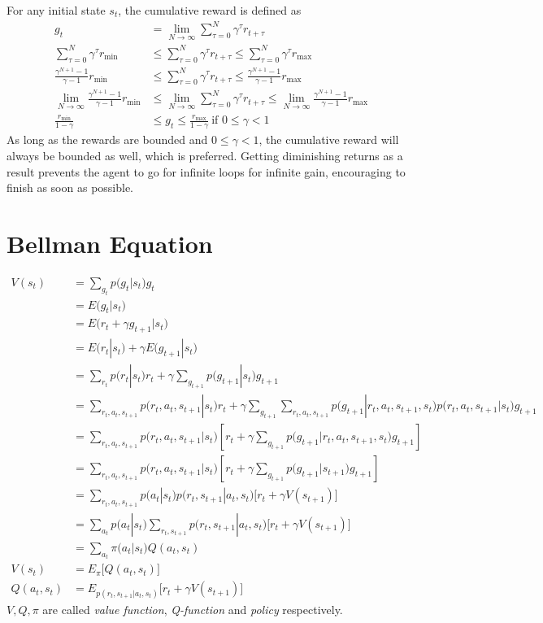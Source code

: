 \documentclass{book}
\numberwithin{equation}{subsection}
\begin{document}
For any initial state $s_t$, the cumulative reward is defined as
\begin{align}
    g_t &= \lim_{N\rightarrow\infty}\sum_{\tau=0}^N \gamma^\tau r_{t+\tau}\\
    \sum_{\tau=0}^N \gamma^\tau r_{\min} &\leq\sum_{\tau=0}^N \gamma^\tau r_{t+\tau}\leq\sum_{\tau=0}^N \gamma^\tau r_{\max}\\
    \frac{\gamma^{N+1}-1}{\gamma-1}r_{\min} &\leq\sum_{\tau=0}^N \gamma^\tau r_{t+\tau}\leq\frac{\gamma^{N+1}-1}{\gamma-1}r_{\max}\\
    \lim_{N\rightarrow\infty}\frac{\gamma^{N+1}-1}{\gamma-1}r_{\min} &\leq\lim_{N\rightarrow\infty}\sum_{\tau=0}^N \gamma^\tau r_{t+\tau}\leq\lim_{N\rightarrow\infty}\frac{\gamma^{N+1}-1}{\gamma-1}r_{\max}\\
    \frac{r_{\min}}{1-\gamma} &\leq g_t\leq\frac{r_{\max}}{1-\gamma}\ \scriptstyle{\text{if $0 \leq \gamma < 1$}}
\end{align}
As long as the rewards are bounded and $0 \leq \gamma < 1$, the cumulative reward will always be bounded as well, which is preferred. Getting diminishing returns as a result prevents the agent to go for infinite loops for infinite gain, encouraging to finish as soon as possible.
\section{Bellman Equation}
\begin{align}
    V(s_t) 
    &= \sum_{g_t}p\big(g_t|s_t\big)g_t\\
    &= E\big(g_t|s_t\big)\\
    &= E\big(r_{t}+\gamma g_{t+1}|s_t\big)\\
    &= E(r_t|s_t)+\gamma E\big(g_{t+1}|s_t\big)\\
    &= \sum_{r_t}p\big(r_t|s_t\big)r_t+\gamma \sum_{g_{t+1}}p\big(g_{t+1}|s_t\big)g_{t+1}\\
    &= \sum_{r_t,a_t,s_{t+1}}p\big(r_t,a_t,s_{t+1}|s_t\big)r_t+\gamma \sum_{g_{t+1}}\sum_{r_t,a_t,s_{t+1}}p\big(g_{t+1}|r_t,a_t,s_{t+1},s_t\big)p\big(r_t,a_t,s_{t+1}|s_t\big)g_{t+1}\\
    &= \sum_{r_t,a_t,s_{t+1}}p\big(r_t,a_t,s_{t+1}|s_t\big)\left[r_t+\gamma \sum_{g_{t+1}}p\big(g_{t+1}|r_t,a_t,s_{t+1},s_t\big)g_{t+1}\right]\\
    &= \sum_{r_t,a_t,s_{t+1}}p\big(r_t,a_t,s_{t+1}|s_t\big)\left[r_t+\gamma \sum_{g_{t+1}}p\big(g_{t+1}|s_{t+1}\big)g_{t+1}\right]\\
    &= \sum_{r_t,a_t,s_{t+1}}p\big(a_t|s_t\big)p\big(r_t,s_{t+1}|a_t,s_t\big)\big[r_t+\gamma V(s_{t+1})\big]\\
    &= \sum_{a_t}p\big(a_t|s_t\big)\sum_{r_t,s_{t+1}}p\big(r_t,s_{t+1}|a_t,s_t\big)\big[r_t+\gamma V(s_{t+1})\big]\\
    &= \sum_{a_t}\pi\big(a_t|s_t\big)Q(a_t, s_t)\\
    V(s_t) &= E_\pi\big[Q(a_t, s_t)\big]\label{valueexp}\\
    Q(a_t, s_t) &= E_{p(r_t,s_{t+1}|a_t,s_t)}\big[r_t+\gamma V(s_{t+1})\big]
\end{align}
$V, Q, \pi$ are called \textit{value function}, \textit{Q-function} and \textit{policy} respectively. 
\end{document}
